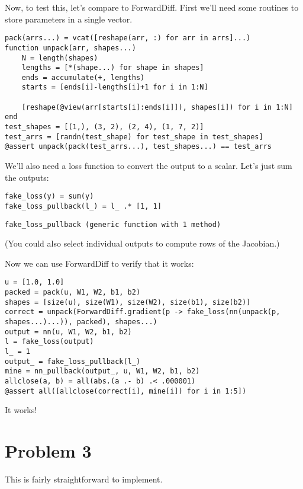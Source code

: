 \documentclass[11pt]{article}
\begin{document}
Now, to test this, let's compare to ForwardDiff. First we'll need some routines to store parameters in a single vector.
\begin{verbatim}
pack(arrs...) = vcat([reshape(arr, :) for arr in arrs]...)
function unpack(arr, shapes...)
    N = length(shapes)
    lengths = [*(shape...) for shape in shapes]
    ends = accumulate(+, lengths)
    starts = [ends[i]-lengths[i]+1 for i in 1:N]

    [reshape(@view(arr[starts[i]:ends[i]]), shapes[i]) for i in 1:N]
end
test_shapes = [(1,), (3, 2), (2, 4), (1, 7, 2)]
test_arrs = [randn(test_shape) for test_shape in test_shapes]
@assert unpack(pack(test_arrs...), test_shapes...) == test_arrs
\end{verbatim}
We'll also need a loss function to convert the output to a scalar. Let's just sum the outputs:
\begin{verbatim}
fake_loss(y) = sum(y)
fake_loss_pullback(l_) = l_ .* [1, 1]
\end{verbatim}
\begin{verbatim}
fake_loss_pullback (generic function with 1 method)
\end{verbatim}

(You could also select individual outputs to compute rows of the Jacobian.)

Now we can use ForwardDiff to verify that it works:
\begin{verbatim}
u = [1.0, 1.0]
packed = pack(u, W1, W2, b1, b2)
shapes = [size(u), size(W1), size(W2), size(b1), size(b2)]
correct = unpack(ForwardDiff.gradient(p -> fake_loss(nn(unpack(p, shapes...)...)), packed), shapes...)
output = nn(u, W1, W2, b1, b2)
l = fake_loss(output)
l_ = 1
output_ = fake_loss_pullback(l_)
mine = nn_pullback(output_, u, W1, W2, b1, b2)
allclose(a, b) = all(abs.(a .- b) .< .000001)
@assert all([allclose(correct[i], mine[i]) for i in 1:5])
\end{verbatim}
It works!

\section{Problem 3}
\label{sec:org189b1b5}
This is fairly straightforward to implement.
\end{document}
